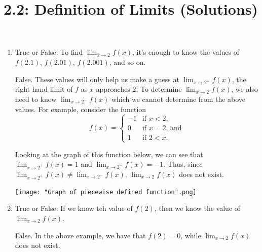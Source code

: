\documentclass[nooutcomes]{ximera}
\title{2.2:  Definition of Limits (Solutions)}
\begin{document}
\begin{abstract}		\end{abstract}
\maketitle

\begin{problem} \hfil
	\begin{enumerate}

	\item  True or False: To find $\lim_{x \to 2} f(x)$, it's enough to know the values of $f(2.1)$, $f(2.01)$, $f(2.001)$, and so on.
	\begin{freeResponse}
	 False.  These values will only help us make a guess at $\lim_{x \to 2^+} f(x)$, the right hand limit of $f$ as $x$ approaches $2$.  To determine $\lim_{x \to 2} f(x)$, we also need to know $\lim_{x \to 2^-} f(x)$ which we cannot determine from the above values.  For example, consider the function
	 	        \[
          f(x) =
        \begin{cases}
         -1 & \mbox{if $x < 2$,}\\
          0 & \mbox{if $x = 2$, and}\\
          1 & \mbox{if $2 < x$.}
        \end{cases}
        \]

	Looking at the graph of this function below, we can see that $\lim_{x \to 2^+} f(x) = 1$ and $\lim_{x \to 2^-} f(x) = -1$.  Thus, since $\lim_{x \to 2^+} f(x) \neq \lim_{x \to 2^-} f(x)$, $\lim_{x \to 2} f(x)$ does not exist.
	
		\begin{image}
          \texttt{[image: "Graph of piecewise defined function".png]}
		\end{image}
	\end{freeResponse}
	
	
	
	\item  True or False: If we know teh value of $f(2)$, then we know the value of $\lim_{x \to 2} f(x)$.
		\begin{freeResponse}
		False.  In the above example, we have that $f(2) = 0$, while $\lim_{x \to 2} f(x)$ does not exist.
		\end{freeResponse}
	\end{enumerate}


\end{problem}
\end{document}
